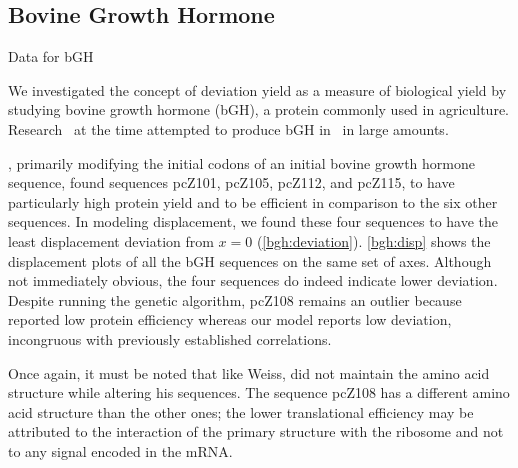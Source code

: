 \documentclass[12pt]{article}
\numberwithin{equation}{section}
\begin{document}
\subsection{Bovine Growth Hormone}
\label{section:bgh}

\begin{cfigure}
  \footnotesize
  \caption{Data for bGH}
\end{cfigure}

We investigated the concept of deviation yield as a measure of biological
yield by studying bovine growth hormone (bGH), a protein commonly used
in agriculture.
Research~\cite{schoner:bgh} at the time attempted to produce bGH
in \ecoli\ in large amounts.

\citet{schoner:bgh}, primarily modifying the initial codons of an
initial bovine growth hormone sequence, found sequences pcZ101,
pcZ105, pcZ112, and pcZ115, to have particularly high protein yield
and to be efficient in comparison to the six other sequences. In
modeling displacement, we found these four sequences  to have the least
displacement deviation from $x = 0$
(\autoref{bgh:deviation}). \autoref{bgh:disp} shows the displacement
plots of all the bGH sequences on the same set of axes. Although not
immediately obvious, the four sequences do indeed indicate lower
deviation. Despite running the genetic algorithm, pcZ108 remains an
outlier because \citeauthor{schoner:bgh} reported low protein
efficiency whereas our model reports low deviation, incongruous with
previously established correlations.

Once again, it must be noted that like Weiss, \citeauthor{schoner:bgh}
did not maintain the amino acid structure while altering his sequences.
The sequence pcZ108 has a different amino acid structure than the other
ones; the lower translational efficiency may be attributed to the interaction
of the primary structure with the ribosome and not to any signal encoded
in the mRNA.
\end{document}
